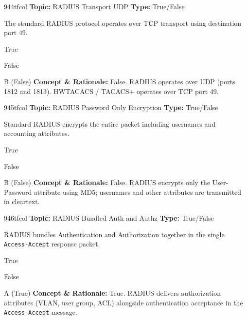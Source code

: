 \begin{qcard}{944}{tfcol}
\textcolor{darkslate!75}{\small\textbf{Topic:} RADIUS Transport UDP \hfill \textbf{Type:} True/False}\vspace{0.4em}\par
The standard RADIUS protocol operates over TCP transport using destination port 49.
\begin{qoptions}
\item True
\item False
\end{qoptions}
\end{qcard}
\nopagebreak
\begin{explainbox}{B (False)}
\textbf{Concept \& Rationale:} False. RADIUS operates over UDP (ports 1812 and 1813). HWTACACS / TACACS+ operates over TCP port 49.
\end{explainbox}

\begin{qcard}{945}{tfcol}
\textcolor{darkslate!75}{\small\textbf{Topic:} RADIUS Password Only Encryption \hfill \textbf{Type:} True/False}\vspace{0.4em}\par
Standard RADIUS encrypts the entire packet including usernames and accounting attributes.
\begin{qoptions}
\item True
\item False
\end{qoptions}
\end{qcard}
\nopagebreak
\begin{explainbox}{B (False)}
\textbf{Concept \& Rationale:} False. RADIUS encrypts only the User-Password attribute using MD5; usernames and other attributes are transmitted in cleartext.
\end{explainbox}

\begin{qcard}{946}{tfcol}
\textcolor{darkslate!75}{\small\textbf{Topic:} RADIUS Bundled Auth and Authz \hfill \textbf{Type:} True/False}\vspace{0.4em}\par
RADIUS bundles Authentication and Authorization together in the single \texttt{Access-Accept} response packet.
\begin{qoptions}
\item True
\item False
\end{qoptions}
\end{qcard}
\nopagebreak
\begin{explainbox}{A (True)}
\textbf{Concept \& Rationale:} True. RADIUS delivers authorization attributes (VLAN, user group, ACL) alongside authentication acceptance in the \texttt{Access-Accept} message.
\end{explainbox}

